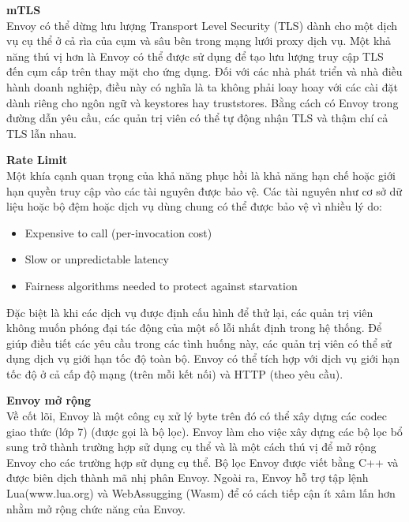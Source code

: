 \documentclass[14pt,a4paper]{book}
\begin{document}
		\textbf{mTLS}\\
		Envoy có thể dừng lưu lượng Transport Level Security (TLS) dành cho một dịch vụ cụ thể ở cả rìa của cụm và sâu bên trong mạng lưới proxy dịch vụ. Một khả năng thú vị hơn là Envoy có thể được sử dụng để tạo lưu lượng truy cập TLS đến cụm cấp trên thay mặt cho ứng dụng. Đối với các nhà phát triển và nhà điều hành doanh nghiệp, điều này có nghĩa là ta không phải loay hoay với các cài đặt dành riêng cho ngôn ngữ và keystores hay truststores. Bằng cách có Envoy trong đường dẫn yêu cầu, các quản trị viên có thể tự động nhận TLS và thậm chí cả TLS lẫn nhau.
		
		\textbf{Rate Limit}\\
		Một khía cạnh quan trọng của khả năng phục hồi là khả năng hạn chế hoặc giới hạn quyền truy cập vào các tài nguyên được bảo vệ. Các tài nguyên như cơ sở dữ liệu hoặc bộ đệm hoặc dịch vụ dùng chung có thể được bảo vệ vì nhiều lý do:
		\begin{itemize}
			\item Expensive to call (per-invocation cost)
			\item Slow or unpredictable latency
			\item Fairness algorithms needed to protect against starvation
		\end{itemize}
		
		Đặc biệt là khi các dịch vụ được định cấu hình để thử lại, các quản trị viên không muốn phóng đại tác động của một số lỗi nhất định trong hệ thống. Để giúp điều tiết các yêu cầu trong các tình huống này, các quản trị viên có thể sử dụng dịch vụ giới hạn tốc độ toàn bộ. Envoy có thể tích hợp với dịch vụ giới hạn tốc độ ở cả cấp độ mạng (trên mỗi kết nối) và HTTP (theo yêu cầu).
		
		\textbf{Envoy mở rộng}\\
		Về cốt lõi, Envoy là một công cụ xử lý byte trên đó có thể xây dựng các codec giao thức (lớp 7) (được gọi là bộ lọc). Envoy làm cho việc xây dựng các bộ lọc bổ sung trở thành trường hợp sử dụng cụ thể và là một cách thú vị để mở rộng Envoy cho các trường hợp sử dụng cụ thể. Bộ lọc Envoy được viết bằng C++ và được biên dịch thành mã nhị phân Envoy. Ngoài ra, Envoy hỗ trợ tập lệnh Lua(www.lua.org) và WebAssugging (Wasm) để có cách tiếp cận ít xâm lấn hơn nhằm mở rộng chức năng của Envoy.
		
\end{document}
